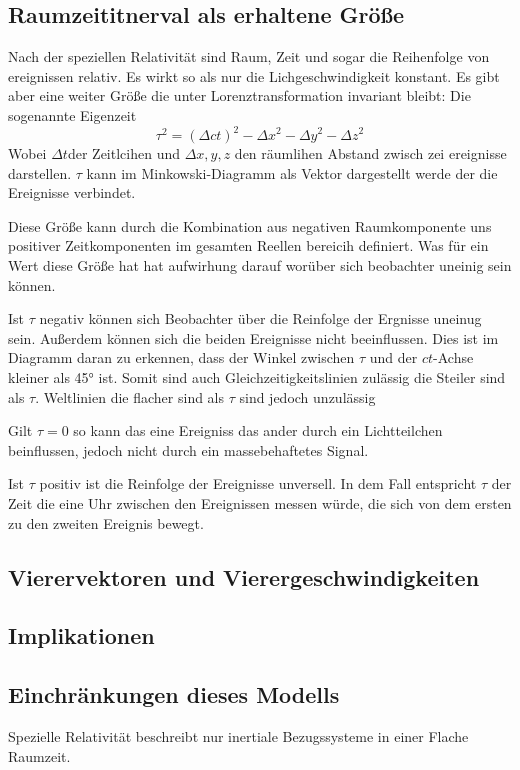 \documentclass[12pt]{article}
\begin{document}
\subsection{Raumzeititnerval als erhaltene Größe}
Nach der speziellen Relativität sind Raum, Zeit und sogar die Reihenfolge von ereignissen relativ.
Es wirkt so als nur die Lichgeschwindigkeit konstant.
Es gibt aber eine weiter Größe die unter Lorenztransformation invariant bleibt:
Die sogenannte Eigenzeit
\begin{equation}
\tau^2 = (\Delta ct)^2 - {\Delta x}^2 - {\Delta y}^2 - {\Delta z}^2
\end{equation}
Wobei $\Delta t$der Zeitlcihen und $\Delta x, y, z$ den räumlihen Abstand zwisch zei ereignisse darstellen.
$\tau$ kann im Minkowski-Diagramm als Vektor dargestellt werde der die Ereignisse verbindet.

Diese Größe kann durch die Kombination aus negativen Raumkomponente uns positiver Zeitkomponenten im gesamten Reellen bereicih definiert.
Was für ein Wert diese Größe hat hat aufwirhung darauf worüber sich beobachter uneinig sein können.

Ist $\tau$ negativ können sich Beobachter über die Reinfolge der Ergnisse uneinug sein.
Außerdem können sich die beiden Ereignisse nicht beeinflussen.
Dies ist im Diagramm daran zu erkennen, dass der Winkel zwischen $\tau$ und der $ct$-Achse kleiner als \ang{45} ist.
Somit sind auch Gleichzeitigkeitslinien zulässig die Steiler sind als $\tau$.
Weltlinien die flacher sind als $\tau$ sind jedoch unzulässig

Gilt $\tau = 0$ so kann das eine Ereigniss das ander durch ein Lichtteilchen beinflussen, jedoch nicht durch ein massebehaftetes Signal.

Ist $\tau$ positiv ist die Reinfolge der Ereignisse unversell.
In dem Fall entspricht $\tau$ der Zeit die eine Uhr zwischen den Ereignissen messen würde, die sich von dem ersten zu den zweiten Ereignis bewegt.
\subsection{Vierervektoren und Vierergeschwindigkeiten}
\subsection{Implikationen}
\subsection{Einchränkungen dieses Modells}
Spezielle Relativität beschreibt nur inertiale Bezugssysteme in einer Flache Raumzeit.
\end{document}
